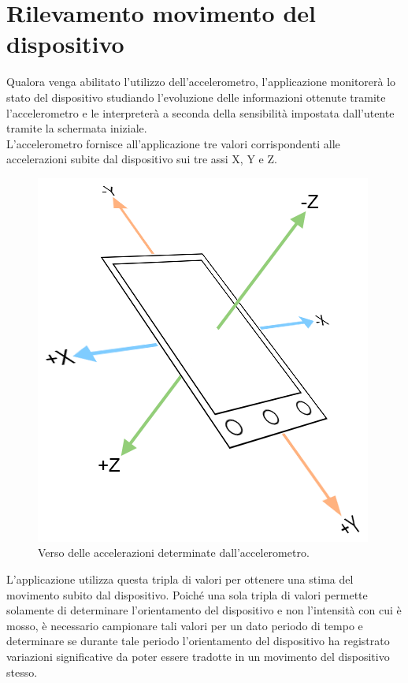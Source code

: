 \section{Rilevamento movimento del dispositivo}
Qualora venga abilitato l'utilizzo dell'accelerometro, l'applicazione monitorerà lo stato del dispositivo studiando l'evoluzione delle informazioni ottenute tramite l'accelerometro e le interpreterà a seconda della sensibilità impostata dall'utente tramite la schermata iniziale.\\

L'accelerometro fornisce all'applicazione tre valori corrispondenti alle accelerazioni subite dal dispositivo sui tre assi X, Y e Z.
\begin{figure}[!ht]
\begin{center}
\includegraphics[scale=.5]{./../wireless/resources/accelerometer.png}
\caption{Verso delle accelerazioni determinate dall'accelerometro.}
\label{fig:Accelerometro}
\end{center}
\end{figure}
L'applicazione utilizza questa tripla di valori per ottenere una stima del movimento subito dal dispositivo. Poiché una sola tripla di valori permette solamente di determinare l'orientamento del dispositivo e non l'intensità con cui è mosso, è necessario campionare tali valori per un dato periodo di tempo e determinare se durante tale periodo l'orientamento del dispositivo ha registrato variazioni significative da poter essere tradotte in un movimento del dispositivo stesso.\\

